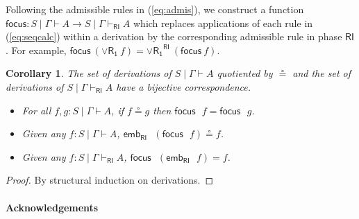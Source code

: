 \documentclass[submission,copyright,creativecommons]{eptcs}
\newtheorem{corollary}[theorem]{Corollary}
\theoremstyle{definition}
\newcommand{\orrone}{\lor \mathsf{R_{1}}}
\newcommand{\RI}{\mathsf{RI}}
\begin{document}
Following the admissible rules in (\ref{eq:admis}), we construct a function $\mathsf{focus} : S \mid \Gamma \vdash A \to S \mid \Gamma \vdash_{\RI} A$ which replaces applications of each rule in (\ref{eq:seqcalc}) within a derivation by the corresponding admissible rule in phase $\RI$.
For example, $\mathsf{focus} \ (\orrone \ f) = \orrone^{\RI} \ (\mathsf{focus} \ f)$.
\begin{corollary}
  The set of derivations of $S \mid \Gamma \vdash A$ quotiented by $\circeq$ and the set of derivations of $S \mid \Gamma \vdash_{\RI} A$ have a bijective correspondence.
  \begin{itemize}
    \item For all $f, g : S \mid \Gamma \vdash A$, if $f \circeq g$ then $\mathsf{focus} \text{ } f = \mathsf{focus} \text{ } g$.
    \item Given any $f : S \mid \Gamma \vdash A$, $\mathsf{emb}_{\RI} \text{ } (\mathsf{focus} \text{ } f) \circeq f$.
    \item Given any $f : S \mid \Gamma \vdash_{\RI} A$, $\mathsf{focus} \text{ } (\mathsf{emb}_{\RI} \text{ } f) = f$.
  \end{itemize}
\end{corollary}
\begin{proof}
  By structural induction on derivations.
\end{proof}

\paragraph{Acknowledgements} 

  
  
\end{document}
